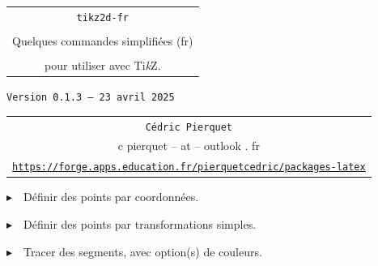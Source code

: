 \documentclass[french,a4paper,11pt]{article}
\def\TPversion{0.1.3}
\def\TPdate{23 avril 2025}
\providecommand\tikzlogo{Ti\textit{k}Z}
\let\TikZ\tikzlogo
\begin{document}
\setlength{\aweboxleftmargin}{0.07\linewidth}
\setlength{\aweboxcontentwidth}{0.93\linewidth}
\setlength{\aweboxvskip}{8pt}

\pagestyle{fancy}

\thispagestyle{empty}

\vspace{2cm}

\begin{center}
	\begin{minipage}{0.75\linewidth}
	\begin{tcolorbox}[colframe=yellow,colback=yellow!15]
		\begin{center}
			\begin{tabular}{c}
				{\Huge \texttt{tikz2d-fr}}\\
				\\
				{\LARGE Quelques commandes simplifiées (fr)} \\
				\\
				{\LARGE pour utiliser avec \TikZ.} \\
			\end{tabular}
			
			\bigskip
			
			{\small \texttt{Version \TPversion{} -- \TPdate}}
		\end{center}
	\end{tcolorbox}
\end{minipage}
\end{center}

\begin{center}
	\begin{tabular}{c}
	\texttt{Cédric Pierquet}\\
	{\ttfamily c pierquet -- at -- outlook . fr}\\
	\texttt{\url{https://forge.apps.education.fr/pierquetcedric/packages-latex}}
\end{tabular}
\end{center}

\vspace{0.25cm}

{$\blacktriangleright$~~Définir des points par coordonnées.}

\smallskip

{$\blacktriangleright$~~Définir des points par transformations simples.}

\smallskip

{$\blacktriangleright$~~Tracer des segments, avec option(s) de couleurs.}

\smallskip
\end{document}

